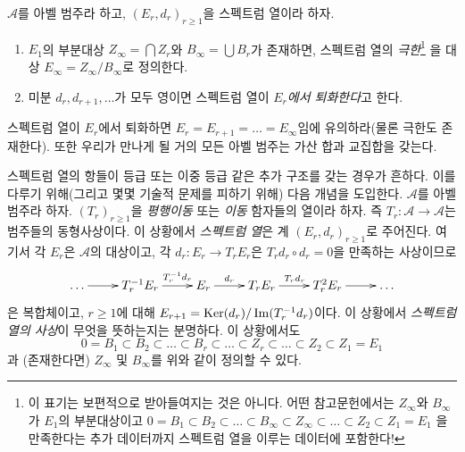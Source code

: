 \begin{definition}
\label{definition-limit-spectral-sequence}
$\mathcal{A}$를 아벨 범주라 하고,
$(E_r, d_r)_{r \geq 1}$을 스펙트럼 열이라 하자.
\begin{enumerate}
\item $E_1$의 부분대상 $Z_{\infty} = \bigcap Z_r$와
$B_{\infty} = \bigcup B_r$가 존재하면, 스펙트럼 열의
{\it 극한}\footnote{이 표기는 보편적으로 받아들여지는 것은 아니다.
어떤 참고문헌에서는
$Z_\infty$와 $B_\infty$가 $E_1$의 부분대상이고
$0 = B_1 \subset B_2 \subset \ldots \subset B_\infty \subset Z_\infty
\subset \ldots \subset Z_2 \subset Z_1 = E_1$
을 만족한다는 추가 데이터까지 스펙트럼 열을 이루는 데이터에 포함한다!}
을 대상 $E_{\infty} = Z_{\infty}/B_{\infty}$로 정의한다.
\item 미분 $d_r, d_{r + 1}, \ldots$가 모두 영이면 스펙트럼 열이
{\it $E_r$에서 퇴화한다}고 한다.
\end{enumerate}
\end{definition}

\noindent
스펙트럼 열이 $E_r$에서 퇴화하면
$E_r = E_{r + 1} = \ldots = E_{\infty}$임에 유의하라(물론 극한도
존재한다). 또한 우리가 만나게 될 거의 모든 아벨 범주는 가산 합과
교집합을 갖는다.

\begin{remark}[변형]
\label{remark-allow-translation-functors}
스펙트럼 열의 항들이 등급 또는 이중 등급 같은 추가 구조를 갖는 경우가
흔하다. 이를 다루기 위해(그리고 몇몇 기술적 문제를 피하기 위해)
다음 개념을 도입한다. $\mathcal{A}$를 아벨 범주라 하자.
$(T_r)_{r \geq 1}$을 {\it 평행이동} 또는 {\it 이동} 함자들의 열이라
하자. 즉
$T_r : \mathcal{A} \to \mathcal{A}$는 범주들의 동형사상이다.
이 상황에서 {\it 스펙트럼 열}은 계 $(E_r, d_r)_{r \geq 1}$로 주어진다.
여기서 각 $E_r$은 $\mathcal{A}$의 대상이고, 각
$d_r : E_r \to T_rE_r$은 $T_rd_r \circ d_r = 0$을 만족하는
사상이므로
$$
\xymatrix{
\ldots \ar[r] &
T_r^{-1}E_r \ar[r]^-{T_r^{-1}d_r} &
E_r \ar[r]^-{d_r} &
T_rE_r \ar[r]^{T_r d_r} &
T_r^2E_r \ar[r] & \ldots
}
$$
은 복합체이고, $r \geq 1$에 대해
$E_{r + 1} = \mathop{\mathrm{Ker}}(d_r)/\mathop{\mathrm{Im}}(T_r^{-1}d_r)$이다. 이 상황에서
{\it 스펙트럼 열의 사상}이 무엇을 뜻하는지는 분명하다.
이 상황에서도
$$
0 = B_1 \subset B_2 \subset \ldots \subset B_r \subset \ldots
\subset Z_r \subset \ldots \subset Z_2 \subset Z_1 = E_1
$$
과 (존재한다면) $Z_\infty$ 및 $B_\infty$를 위와 같이 정의할 수 있다.
\end{remark}










